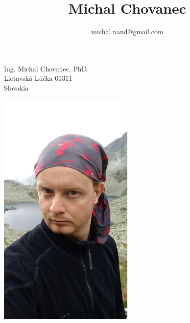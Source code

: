 \documentclass[10pt]{article}
\title{\bfseries\Huge Michal Chovanec}
\author{michal.nand@gmail.com}
\date{}
\begin{document}
\maketitle





\begin{minipage}{0.5\textwidth}

	Ing. Michal Chovanec, PhD. \\
	Lietavská Lúčka 01311\\
	Slovakia

\end{minipage} \hfill
\begin{minipage}{0.45\textwidth}

	\begin{flushright}
	\includegraphics[width=0.5\textwidth]{photo2.jpg}
	\end{flushright}

\end{minipage}
\end{document}
